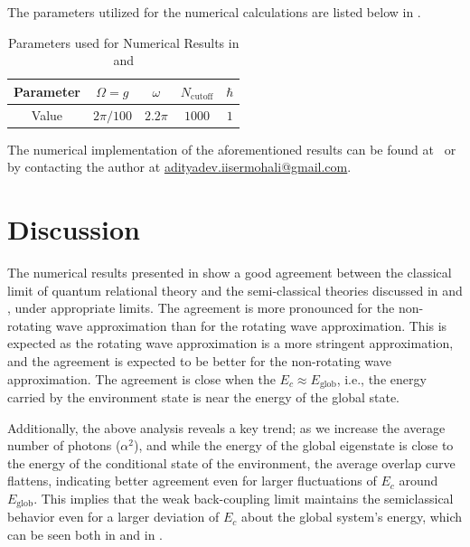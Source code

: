 The parameters utilized for the numerical calculations are listed below in .
\begin{table}[!ht]
    \centering
        \begin{tabular}{|c|c|c|c|c|}
            \hline
            Parameter & $\Omega = g$ & $\omega$ & $N_{\text{cutoff}}$ & $\hbar$ \\
            \hline
            Value & $2\pi/100$ & $2.2\pi$ & $1000$ & $1$ \\
            \hline
        \end{tabular}
    \caption{Parameters used for Numerical Results in  and 
    }
    \label{tab:numerical_values_JC}
\end{table}

\noindent
The numerical implementation of the aforementioned results can be found at~\cite{AdityaDev} or by contacting the author at \href{mailto:adityadev.iisermohali@gmail.com}{adityadev.iisermohali@gmail.com}.


\newpage 


\section{Discussion\label{sec:discussion}}
The numerical results presented in  show a good agreement
between the classical limit of quantum relational theory and the semi-classical theories
discussed in  and , under appropriate limits. 
The agreement is more pronounced for the non-rotating wave approximation than for the rotating wave approximation. This is expected as the rotating wave approximation is a more stringent approximation, and the
agreement is expected to be better for the non-rotating wave approximation.
The agreement is close when the \(E_c \approx E_{\mathrm{glob}}\), 
i.e., the energy carried by the environment state is near the energy of the global state. 

Additionally,  the above analysis reveals a key trend; as we increase the average number of photons (\(\alpha^2\)), and while the energy
of the global eigenstate is close to the energy of the conditional state of the environment, the average overlap curve flattens, indicating better agreement even for larger fluctuations of \(E_c\) around \(E_{\mathrm{glob}}\). This implies that the weak back-coupling limit maintains the semiclassical behavior even for a larger deviation of \(E_c\) about the global system's energy, which can be seen both in  and in . 

